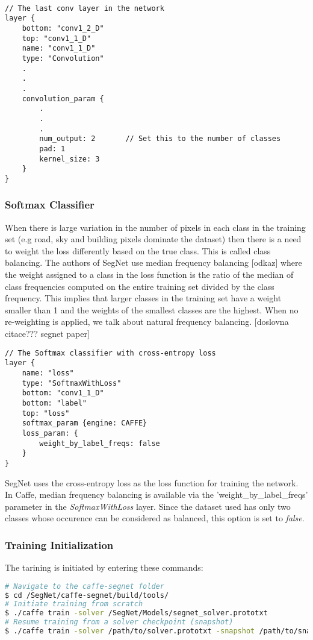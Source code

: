 \begin{lstlisting}

// The last conv layer in the network
layer {
	bottom: "conv1_2_D"
	top: "conv1_1_D"
	name: "conv1_1_D"
	type: "Convolution"
	.
	.
	.
	convolution_param {
		.
		.
		.
		num_output: 2		// Set this to the number of classes
		pad: 1
		kernel_size: 3
	}
}
\end{lstlisting}

\subsubsection{Softmax Classifier}

When there is large variation in the number of pixels in each class in the training set (e.g road, sky and building pixels dominate the dataset) then there is a need to weight the loss differently based on the true class. This is called class balancing. The authors of SegNet use median frequency balancing [odkaz] where the weight assigned to a class in the loss function is the ratio of the median of class frequencies computed on the entire training set divided by the class frequency. This implies that larger classes in the training set have a weight smaller than 1 and the weights of the smallest classes are the highest. When no re-weighting is applied, we talk about natural frequency balancing. [doslovna citace??? segnet paper]

\begin{lstlisting}
// The Softmax classifier with cross-entropy loss
layer {
	name: "loss"
	type: "SoftmaxWithLoss"
	bottom: "conv1_1_D"
	bottom: "label"
	top: "loss"
	softmax_param {engine: CAFFE}
	loss_param: {
		weight_by_label_freqs: false	     
	}
}
\end{lstlisting}

SegNet uses the cross-entropy loss as the loss function for training the network. In Caffe, median frequency balancing is available via the 'weight\_by\_label\_freqs' parameter in the \textit{SoftmaxWithLoss} layer. Since the dataset used has only two classes whose occurence can be considered as balanced, this option is set to \textit{false}. 

\subsubsection{Training Initialization}

\noindent The tarining is initiated by entering these commands:

\begin{lstlisting}[language=bash]
# Navigate to the caffe-segnet folder
$ cd /SegNet/caffe-segnet/build/tools/
# Initiate training from scratch
$ ./caffe train -solver /SegNet/Models/segnet_solver.prototxt
# Resume training from a solver checkpoint (snapshot)
$ ./caffe train -solver /path/to/solver.prototxt -snapshot /path/to/snapshot_iter_XY.solverstate
\end{lstlisting}

